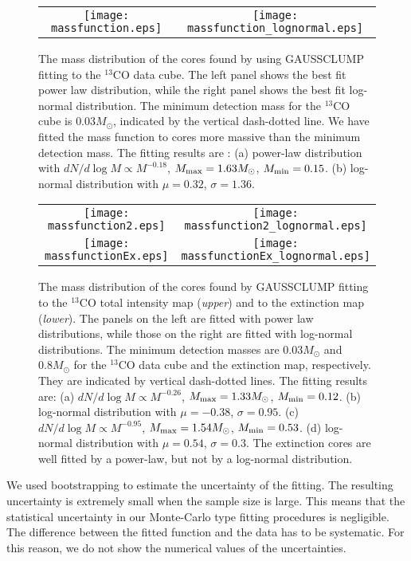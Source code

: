 \documentclass[12pt,preprint]{aastex}
\begin{document}
\begin{figure}[htb]
\begin{tabular}{cc}
\texttt{[image: massfunction.eps]} & \texttt{[image: massfunction\_lognormal.eps]}\\
\end{tabular}
\caption{ The mass distribution of the cores found by using GAUSSCLUMP fitting to the $^{13}$CO data cube.
The left panel shows the best fit power law distribution, while the right panel shows the best fit log-normal distribution.
The minimum detection mass for the $^{13}$CO cube is $0.03M_{\odot}$, indicated by the vertical dash-dotted line.
We have fitted the mass function to cores more massive than the minimum detection mass.
The fitting results are :
(a) power-law distribution with $dN/d\log M\propto M^{-0.18}$, $M_{\rm max}=1.63 M_{\odot}$, $M_{\rm min}=0.15$.
(b) log-normal distribution with $\mu=0.32$, $\sigma=1.36$.
\label{massfunction}}
\end{figure}

\begin{figure}[htb]
\begin{tabular}{cc}
\texttt{[image: massfunction2.eps]} & \texttt{[image: massfunction2\_lognormal.eps]}\\
\texttt{[image: massfunctionEx.eps]} & \texttt{[image: massfunctionEx\_lognormal.eps]}\\
\end{tabular}
\caption{ The mass distribution of the cores found by GAUSSCLUMP fitting to the $^{13}$CO total intensity map ({\it upper}) and to the extinction map ({\it lower}).
The panels on the left are fitted with power law distributions, while those on the right are fitted with log-normal distributions. The minimum detection masses are $0.03M_{\odot}$ and $0.8 M_{\odot}$ for the $^{13}$CO data cube and the extinction map, respectively. They are indicated by vertical dash-dotted lines.
The fitting results are:
(a) $dN/d\log M\propto M^{-0.26}$, $M_{\rm max}=1.33 M_{\odot}$, $M_{\rm min}=0.12$.
(b) log-normal distribution with $\mu=-0.38$, $\sigma=0.95$.
(c) $dN/d\log M\propto M^{-0.95}$, $M_{\rm max}=1.54 M_{\odot}$, $M_{\rm min}=0.53$.
(d) log-normal distribution with $\mu=0.54$, $\sigma=0.3$.
The extinction cores are well fitted by a power-law, but not by a log-normal distribution.
\label{massfunction2}}
\end{figure}

We used bootstrapping to estimate the uncertainty of the fitting. The resulting uncertainty is extremely small
when the sample size is large. This means that the statistical uncertainty in our Monte-Carlo type fitting procedures is negligible. The difference between the fitted function and the data has to be systematic.
For this reason, we do not show the numerical values of the uncertainties.
\end{document}

